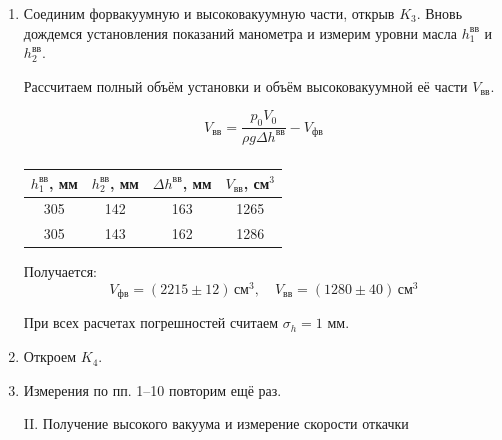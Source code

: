 \documentclass[a4paper,12pt]{article} %
\begin{document}
\begin{enumerate}
  \item Соединим форвакуумную и высоковакуумную части, открыв $K_3$. Вновь дождемся установления показаний манометра и измерим уровни масла $h_1^{\text{вв}}$ и $h_2^{\text{вв}}$.
  
  Рассчитаем полный объём установки и объём высоковакуумной её части $V_{\text{вв}}$.
  
  \begin{equation}
    V_{\text{вв}} = \frac{p_0 V_0}{\rho g \Delta h^{\text{вв}}} - V_{\text{фв}}
  \end{equation}
  
  \begin{table}[h]
    \caption{}
    \begin{tabular}{|c|c|c|c|}
        \hline $h_1^{\text{вв}}$, мм  &  $h_2^{\text{вв}}$, мм & $\Delta h^{\text{вв}}$, мм  &  $V_{\text{вв}}$, см$^3$ \\
        \hline
        305 & 142 & 163 & 1265 \\
        305 & 143 & 162 & 1286  \\
        \hline 
    \end{tabular}
    \label{tab:hv_data}
  \end{table}

  Получается:
  \begin{equation}
    V_{\text{фв}} = (2215 \pm 12) \, \text{см}^3, \quad V_{\text{вв}} = (1280 \pm 40) \, \text{см}^3
  \end{equation}

  При всех расчетах погрешностей считаем $\sigma_h = 1$ мм.

  \item Откроем $K_4$.
  \item Измерения по пп. 1–10 повторим ещё раз.

\begin{center}
  \textsf{II. Получение высокого вакуума и измерение скорости откачки}
\end{center}


\end{enumerate}
\end{document}

